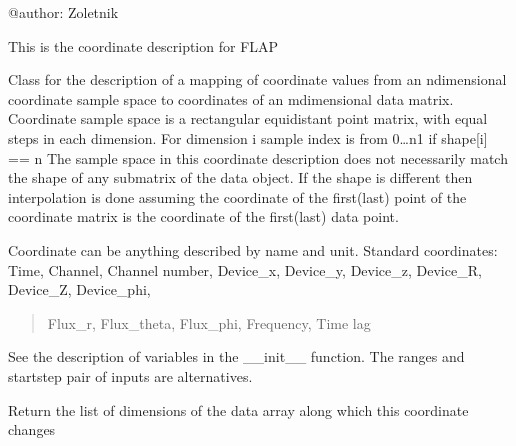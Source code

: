 \documentclass[letterpaper,10pt,english]{sphinxmanual}
\begin{document}
@author: Zoletnik

This is the coordinate description for FLAP

\begin{fulllineitems}
\label{\detokenize{coordinate:flap.coordinate.Coordinate}}
Class for the description of a mapping of coordinate values from an n\sphinxhyphen{}dimensional coordinate
sample space to coordinates of an m\sphinxhyphen{}dimensional data matrix.
Coordinate sample space is a rectangular equidistant point matrix, with equal steps in each dimension.
For dimension i sample index is from 0…n\sphinxhyphen{}1 if shape{[}i{]} == n
The sample space in this coordinate description does not necessarily match the shape of
any sub\sphinxhyphen{}matrix of the data object. If the shape is different then interpolation is done assuming
the coordinate of the first(last) point of the coordinate matrix is the coordinate of the first(last)
data point.

Coordinate can be anything described by name and unit.
Standard coordinates: Time, Channel, Channel number, Device\_x, Device\_y, Device\_z, Device\_R, Device\_Z, Device\_phi,
\begin{quote}

Flux\_r, Flux\_theta, Flux\_phi, Frequency, Time lag
\end{quote}

See the description of variables in the \_\_init\_\_ function.
The ranges and start\sphinxhyphen{}step pair of inputs are alternatives.

\begin{fulllineitems}
\label{\detokenize{coordinate:flap.coordinate.Coordinate.change_dimensions}}
Return the list of dimensions of the data array along which this coordinate
changes


\end{fulllineitems}
\end{fulllineitems}
\end{document}
